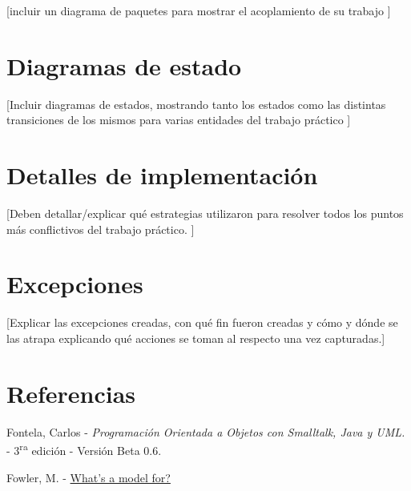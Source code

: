 [incluir un diagrama de paquetes para mostrar el acoplamiento de su
trabajo ]

\section{Diagramas de estado}

[Incluir diagramas de estados, mostrando tanto los estados como las
distintas transiciones de los mismos para varias entidades del trabajo
práctico ]

\section{Detalles de implementación}

[Deben detallar/explicar qué estrategias utilizaron para resolver todos
los puntos más conflictivos del trabajo práctico. ]

\section{Excepciones}

[Explicar las excepciones creadas, con qué fin fueron creadas y cómo y
dónde se las atrapa explicando qué acciones se toman al respecto una vez
capturadas.]

\appendix
\section{Referencias}
\begingroup
\renewcommand{\section}[2]{}
\begin{thebibliography}{10}
	 Fontela, Carlos - \emph{Programación Orientada a Objetos con Smalltalk, Java y UML.} - 3\textsuperscript{ra} edición - Versión Beta 0.6.
	
	 Fowler, M. - \hyperref{https://martinfowler.com/distributedComputing/purpose.pdf}{}{}{What's a model for?}
\end{thebibliography}
\endgroup


